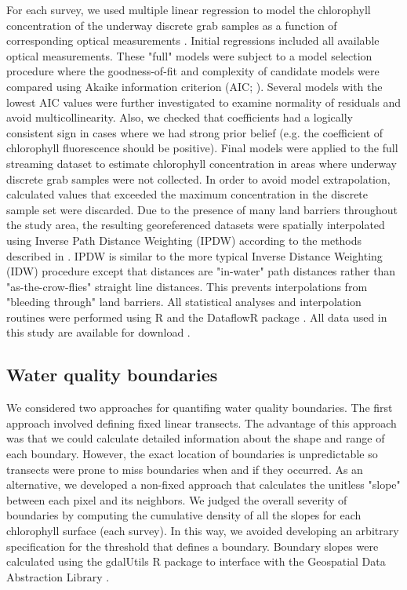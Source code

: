 For each survey, we used multiple linear regression to model the chlorophyll concentration of the underway discrete grab samples as a function of corresponding optical measurements \citep{seppala_ship_opportunity_2007,seppala_multivariate_2008}. Initial regressions included all available optical measurements. These "full" models were subject to a model selection procedure where the goodness-of-fit and complexity of candidate models were compared using Akaike information criterion (AIC; \citealp{venables2002modern}). Several models with the lowest AIC values were further investigated to examine normality of residuals and avoid multicollinearity. Also, we checked that coefficients had a logically consistent sign in cases where we had strong prior belief (e.g. the coefficient of chlorophyll fluorescence should be positive). Final models were applied to the full streaming dataset to estimate chlorophyll concentration in areas where underway discrete grab samples were not collected. In order to avoid model extrapolation, calculated values that exceeded the maximum concentration in the discrete sample set were discarded. Due to the presence of many land barriers throughout the study area, the resulting georeferenced datasets were spatially interpolated using Inverse Path Distance Weighting (IPDW) according to the methods described in \citep{stachelek_application_2015}. IPDW is similar to the more typical Inverse Distance Weighting (IDW) procedure except that distances are "in-water" path distances rather than "as-the-crow-flies" straight line distances. This prevents interpolations from "bleeding through" land barriers. All statistical analyses and interpolation routines were performed using R \citep{rcore_2015} and the DataflowR package \citep{dataflowr}. All data used in this study are available for download \citep{madden2017}.

\subsection{Water quality boundaries}
\label{boundarymethods}

We considered two approaches for quantifing water quality boundaries. The first approach involved defining fixed linear transects. The advantage of this approach was that we could calculate detailed information about the shape and range of each boundary. However, the exact location of boundaries is unpredictable so transects were prone to miss boundaries when and if they occurred. As an alternative, we developed a non-fixed approach that calculates the unitless "slope" between each pixel and its neighbors. We judged the overall severity of boundaries by computing the cumulative density of all the slopes for each chlorophyll surface (each survey). In this way, we avoided developing an arbitrary specification for the threshold that defines a boundary. Boundary slopes were calculated using the gdalUtils R package to interface with the Geospatial Data Abstraction Library \citep{gdalUtils, GDAL2017}.


